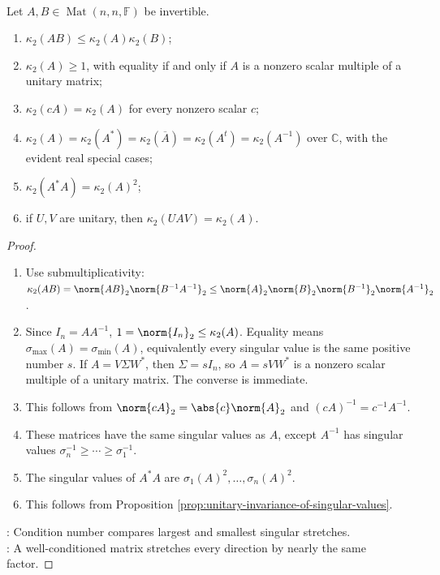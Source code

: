 \begin{proposition} \label{prop:spectral-condition-number-properties} \\
Let $A,B\in\operatorname{Mat}(n,n,\mathbb{F})$ be invertible.
\begin{enumerate}[label=(\roman*)]
\setlength{\itemsep}{0pt}
\item $\kappa_2(AB)\leq\kappa_2(A)\kappa_2(B)$;
\item $\kappa_2(A)\geq1$, with equality if and only if $A$ is a nonzero scalar multiple of a unitary matrix;
\item $\kappa_2(cA)=\kappa_2(A)$ for every nonzero scalar $c$;
\item $\kappa_2(A)=\kappa_2(A^*)=\kappa_2(\overline{A})=\kappa_2(A^t)=\kappa_2(A^{-1})$ over $\mathbb{C}$, with the evident real special cases;
\item $\kappa_2(A^*A)=\kappa_2(A)^2$;
\item if $U,V$ are unitary, then $\kappa_2(UAV)=\kappa_2(A)$.
\end{enumerate}
\begin{proof}
\begin{enumerate}[label=(\roman*)]
\setlength{\itemsep}{0pt}
\item Use submultiplicativity: $\kappa_2(AB)=\norm{AB}_2\norm{B^{-1}A^{-1}}_2\leq\norm{A}_2\norm{B}_2\norm{B^{-1}}_2\norm{A^{-1}}_2$.
\item Since $I_n=AA^{-1}$, $1=\norm{I_n}_2\leq\kappa_2(A)$. Equality means $\sigma_{\max}(A)=\sigma_{\min}(A)$, equivalently every singular value is the same positive number $s$. If $A=V\Sigma W^*$, then $\Sigma=sI_n$, so $A=sVW^*$ is a nonzero scalar multiple of a unitary matrix. The converse is immediate.
\item This follows from $\norm{cA}_2=\abs{c}\norm{A}_2$ and $(cA)^{-1}=c^{-1}A^{-1}$.
\item These matrices have the same singular values as $A$, except $A^{-1}$ has singular values $\sigma_n^{-1}\geq\cdots\geq\sigma_1^{-1}$.
\item The singular values of $A^*A$ are $\sigma_1(A)^2,\ldots,\sigma_n(A)^2$.
\item This follows from Proposition \ref{prop:unitary-invariance-of-singular-values}.
\end{enumerate}
: Condition number compares largest and smallest singular stretches.\\
: A well-conditioned matrix stretches every direction by nearly the same factor.
\end{proof}
\end{proposition}

